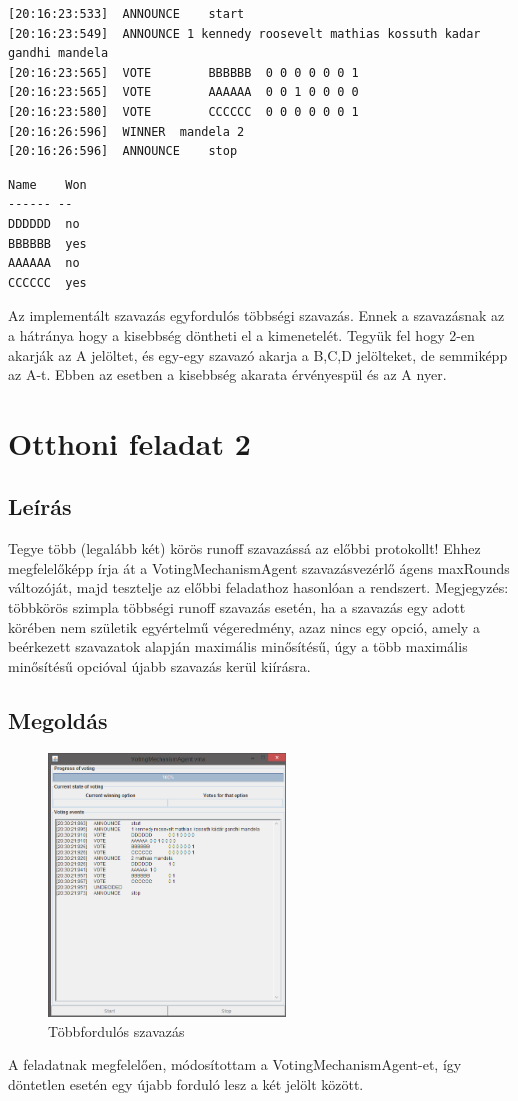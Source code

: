 \begin{lstlisting}[caption=A log.txt tartalma, frame=single,float=!ht]
[20:16:23:533]	ANNOUNCE	start
[20:16:23:549] 	ANNOUNCE 1 kennedy roosevelt mathias kossuth kadar gandhi mandela
[20:16:23:565]	VOTE		BBBBBB	0 0 0 0 0 0 1
[20:16:23:565]	VOTE		AAAAAA	0 0 1 0 0 0 0
[20:16:23:580]	VOTE		CCCCCC	0 0 0 0 0 0 1
[20:16:26:596]	WINNER	mandela 2
[20:16:26:596]	ANNOUNCE	stop
\end{lstlisting}
\begin{lstlisting}[caption=A rest.txt tartalma, frame=single,float=!ht]
Name	Won
------ --
DDDDDD	no
BBBBBB	yes
AAAAAA	no
CCCCCC	yes
\end{lstlisting}

Az implementált szavazás egyfordulós többségi szavazás. Ennek a szavazásnak az a hátránya hogy a kisebbség döntheti el a kimenetelét. Tegyük fel hogy 2-en akarják az A jelöltet, és egy-egy szavazó akarja a B,C,D jelölteket, de semmiképp az A-t. Ebben az esetben a kisebbség akarata érvényespül és az A nyer.

\section{Otthoni feladat 2}
\subsection{Leírás}
Tegye több (legalább két) körös runoff szavazássá az előbbi protokollt! Ehhez
megfelelőképp írja át a  VotingMechanismAgent szavazásvezérlő ágens  maxRounds
változóját, majd tesztelje az előbbi feladathoz hasonlóan a rendszert.  Megjegyzés:
többkörös szimpla többségi runoff szavazás esetén, ha a szavazás egy adott körében nem születik
egyértelmű végeredmény, azaz nincs egy opció, amely a beérkezett szavazatok alapján maximális
minősítésű, úgy a több maximális minősítésű opcióval újabb szavazás kerül kiírásra.
\subsection{Megoldás}
\begin{figure}[!h]
\begin{center}
\includegraphics[height=7cm]{figures/ofel2.png}
\caption{Többfordulós szavazás}
\end{center}
\end{figure}
A feladatnak megfelelően, módosítottam a VotingMechanismAgent-et, így döntetlen esetén egy újabb forduló lesz a két jelölt között.

